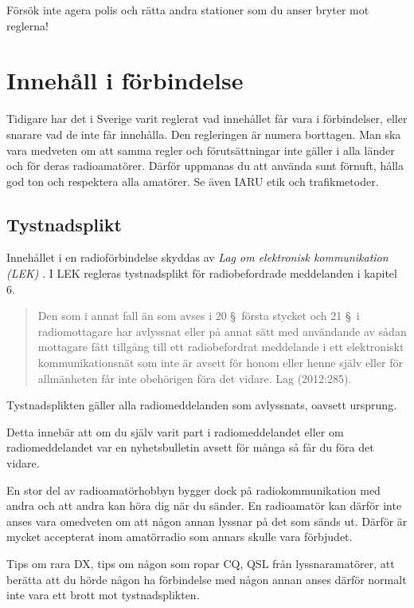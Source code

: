 Försök inte agera polis och rätta andra stationer som du anser bryter mot reglerna!

\section{Innehåll i förbindelse}
\label{innehåll i förbindelse}

Tidigare har det i Sverige varit reglerat vad innehållet får vara i
förbindelser, eller snarare vad de inte får innehålla.
Den regleringen är numera borttagen.
Man ska vara medveten om att samma regler och förutsättningar inte gäller i
alla länder och för deras radioamatörer.
Därför uppmanas du att använda sunt förnuft, hålla god ton och respektera alla
amatörer.
Se även IARU etik och trafikmetoder.

\subsection{Tystnadsplikt}

Innehållet i en radioförbindelse skyddas av
\emph{Lag om elektronisk kommunikation (LEK)} \cite{SFS2003:389}.
I LEK regleras tystnadsplikt för radiobefordrade meddelanden i kapitel 6.

\begin{quote}
	Den som i annat fall än som avses i 20 \S~första stycket och 21 \S~i
	radiomottagare har avlyssnat eller på annat sätt med användande av sådan
	mottagare fått tillgång till ett radiobefordrat meddelande i ett
	elektroniskt kommunikationsnät som inte är avsett för honom eller henne
	själv eller för allmänheten får inte obehörigen föra det vidare.
	Lag (2012:285).\cite[kap 6, \S23]{SFS2003:389}
\end{quote}

Tystnadsplikten gäller alla radiomeddelanden som avlyssnats, oavsett ursprung.

Detta innebär att om du själv varit part i radiomeddelandet eller om 
radiomeddelandet var en nyhetsbulletin avsett för många så får du föra det vidare.

En stor del av radioamatörhobbyn bygger dock på radiokommunikation med andra och
att andra kan höra dig när du sänder.
En radioamatör kan därför inte anses vara omedveten om att någon annan lyssnar
på det som sänds ut.
Därför är mycket accepterat inom amatörradio som annars skulle vara förbjudet.

Tips om rara DX, tips om någon som ropar CQ, QSL från lyssnaramatörer, att
berätta att du hörde någon ha förbindelse med någon annan anses därför normalt
inte vara ett brott mot tystnadsplikten.

